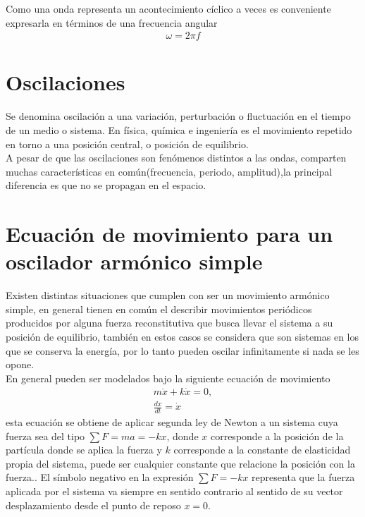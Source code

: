 \documentclass[12pt]{article}
\begin{document}
Como una onda representa un acontecimiento cíclico a veces es conveniente expresarla en términos de una frecuencia angular
\begin{align}
    \omega = 2\pi f
\end{align} 

\section{Oscilaciones}

Se denomina oscilación a una variación, perturbación o fluctuación en el tiempo de un medio o sistema. En física, química e ingeniería es el movimiento repetido en torno a una posición central, o posición de equilibrio.\\

A pesar de que las oscilaciones son fenómenos distintos a las ondas, comparten muchas características en común(frecuencia, periodo, amplitud),la principal diferencia es que no se propagan en el espacio.


\section{Ecuación de movimiento para un oscilador armónico simple}

Existen distintas situaciones que cumplen con ser un movimiento armónico simple, en general tienen en común el describir movimientos periódicos producidos por alguna fuerza reconstitutiva que busca llevar el sistema a su posición de equilibrio, también en estos casos se considera que son sistemas en los que se conserva la energía, por lo tanto pueden oscilar infinitamente si nada se les opone.\\

En general pueden ser modelados bajo la siguiente ecuación de movimiento
\begin{align}
    m\ddot{x} + k \dot{x } = 0 ,\label{eq: movimiento-armónico-simple}\\
    \frac{dx}{dt} = \dot{x} \nonumber
\end{align}
esta ecuación se obtiene de aplicar segunda ley de Newton a un sistema cuya fuerza sea del tipo \( \sum F = ma = -kx\), donde \(x\) corresponde a la posición de la partícula donde se aplica la fuerza y \(k\) corresponde a la constante de elasticidad propia del sistema, puede  ser cualquier constante que relacione la posición con la fuerza.. El símbolo negativo en la expresión \(\sum F = - kx \) representa que la fuerza aplicada por el sistema va siempre en sentido contrario al sentido de su vector desplazamiento desde el punto de reposo \( x =  0\).\\
\end{document}
